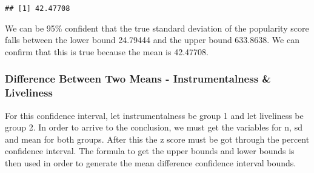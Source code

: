 \documentclass[
]{article}
\newenvironment{Shaded}{\begin{snugshade}}{\end{snugshade}}
\newcommand{\KeywordTok}[1]{\textcolor[rgb]{0.13,0.29,0.53}{\textbf{#1}}}
\newcommand{\NormalTok}[1]{#1}
\newcommand{\OperatorTok}[1]{\textcolor[rgb]{0.81,0.36,0.00}{\textbf{#1}}}
\newcommand{\StringTok}[1]{\textcolor[rgb]{0.31,0.60,0.02}{#1}}
\begin{document}
\begin{Shaded}
\end{Shaded}

\begin{verbatim}
## [1] 42.47708
\end{verbatim}

We can be 95\% confident that the true standard deviation of the
popularity score falls between the lower bound 24.79444 and the upper
bound 633.8638. We can confirm that this is true because the mean is
42.47708.

\hypertarget{difference-between-two-means---instrumentalness-liveliness}{%
\subsubsection{Difference Between Two Means - Instrumentalness \&
Liveliness}\label{difference-between-two-means---instrumentalness-liveliness}}

For this confidence interval, let instrumentalness be group 1 and let
liveliness be group 2. In order to arrive to the conclusion, we must get
the variables for n, sd and mean for both groups. After this the z score
must be got through the percent confidence interval. The formula to get
the upper bounds and lower bounds is then used in order to generate the
mean difference confidence interval bounds.
\end{document}
